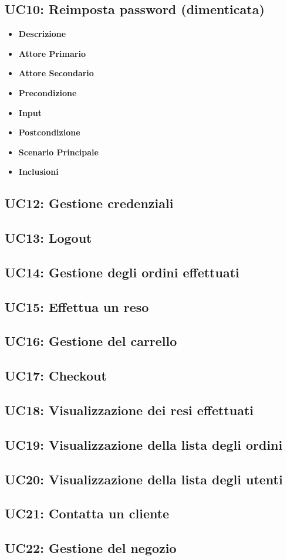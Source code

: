         \subsection{UC10: Reimposta password (dimenticata)}
        \begin{itemize}
            \item \textbf{Descrizione}
            \item \textbf{Attore Primario}
            \item \textbf{Attore Secondario}
            \item \textbf{Precondizione}
            \item \textbf{Input}
            \item \textbf{Postcondizione}
            \item \textbf{Scenario Principale}
            \item \textbf{Inclusioni}
        \end{itemize}
        \subsection{UC12: Gestione credenziali}
        \subsection{UC13: Logout}
        \subsection{UC14: Gestione degli ordini effettuati}
        \subsection{UC15: Effettua un reso}
        \subsection{UC16: Gestione del carrello}
        \subsection{UC17: Checkout}
        \subsection{UC18: Visualizzazione dei resi effettuati}
        \subsection{UC19: Visualizzazione della lista degli ordini}
        \subsection{UC20: Visualizzazione della lista degli utenti}
        \subsection{UC21: Contatta un cliente}
        \subsection{UC22: Gestione del negozio}

